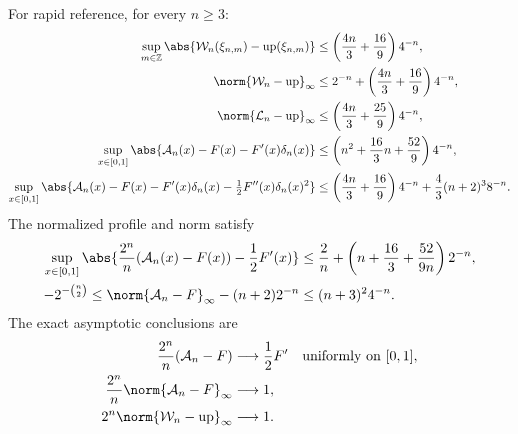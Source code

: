 \documentclass[11pt,oneside]{article}
\theoremstyle{definition}
\theoremstyle{remark}
\newcommand{\Z}{\mathbb Z}
\newcommand{\Up}{\operatorname{up}}
\begin{document}
For rapid reference, for every $n\ge3$:
\begin{align*}
\sup_{m\in\Z}
 \abs{\mathcal W_n(\xi_{n,m})-\Up(\xi_{n,m})}
 &\le\left(\frac{4n}{3}+\frac{16}{9}\right)4^{-n},\\
\norm{\mathcal W_n-\Up}_\infty
 &\le2^{-n}+\left(\frac{4n}{3}+\frac{16}{9}\right)4^{-n},\\
\norm{\mathcal L_n-\Up}_\infty
 &\le\left(\frac{4n}{3}+\frac{25}{9}\right)4^{-n},\\
\sup_{x\in[0,1]}
 \abs{\mathcal A_n(x)-F(x)-F'(x)\delta_n(x)}
 &\le\left(n^2+\frac{16}{3}n+\frac{52}{9}\right)4^{-n},\\
\sup_{x\in[0,1]}
 \abs{\mathcal A_n(x)-F(x)-F'(x)\delta_n(x)
       -\tfrac12F''(x)\delta_n(x)^2}
 &\le\left(\frac{4n}{3}+\frac{16}{9}\right)4^{-n}
      +\frac43(n+2)^3 8^{-n}.
\end{align*}
The normalized profile and norm satisfy
\begin{align*}
 \sup_{x\in[0,1]}
 \abs{\frac{2^n}{n}(\mathcal A_n(x)-F(x))-\frac12F'(x)}
 &\le \frac2n+\left(n+\frac{16}{3}+\frac{52}{9n}\right)2^{-n},\\
 -2^{-\binom n2}
 \le \norm{\mathcal A_n-F}_\infty-(n+2)2^{-n}
 &\le(n+3)^2 4^{-n}.
\end{align*}
The exact asymptotic conclusions are
\begin{align*}
 \frac{2^n}{n}(\mathcal A_n-F)
 &\longrightarrow\frac12F' &&\text{uniformly on }[0,1],\\
 \frac{2^n}{n}\norm{\mathcal A_n-F}_\infty
 &\longrightarrow1,\\
 2^n\norm{\mathcal W_n-\Up}_\infty
 &\longrightarrow1.
\end{align*}
\end{document}
